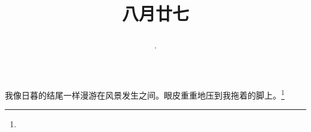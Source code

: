 \title{\date[d=29,m=9,y=2024][year:cn-y,年,month:cn,day:cn,日,·,weekday]·八月廿七 }
我像日暮的结尾一样漫游在风景发生之间。眼皮重重地压到我拖着的脚上。\footnote{ }

